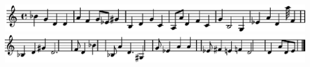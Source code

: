 \includegraphics{M-2-ts-50-nit-50-fw-hmml.pkl-1}%
\ifx\betweenLilyPondSystem \undefined
  \linebreak
\else
  \expandafter{}%
\fi
\includegraphics{M-2-ts-50-nit-50-fw-hmml.pkl-2}%
